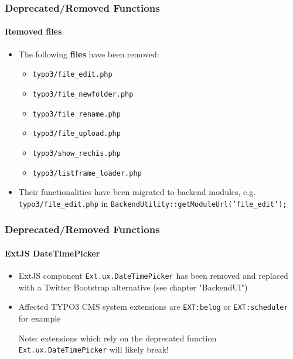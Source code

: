 \begin{frame}[fragile]
	\frametitle{Deprecated/Removed Functions}
	\framesubtitle{Removed files}

	\begin{itemize}
		\item The following \textbf{files} have been removed:

			\begin{itemize}
				\item \texttt{typo3/file\_edit.php}
				\item \texttt{typo3/file\_newfolder.php}
				\item \texttt{typo3/file\_rename.php}
				\item \texttt{typo3/file\_upload.php}
				\item \texttt{typo3/show\_rechis.php}
				\item \texttt{typo3/listframe\_loader.php}
			\end{itemize}

		\item Their functionalities have been migrated to backend modules,
			e.g. \texttt{typo3/file\_edit.php} in \texttt{BackendUtility::getModuleUrl('file\_edit');}

	\end{itemize}

\end{frame}


\begin{frame}[fragile]
	\frametitle{Deprecated/Removed Functions}
	\framesubtitle{ExtJS DateTimePicker}

	\begin{itemize}

		\item ExtJS component \texttt{Ext.ux.DateTimePicker} has been removed and replaced
			with a Twitter Bootstrap alternative (see chapter "BackendUI")

		\item Affected TYPO3 CMS system extensions are \texttt{EXT:belog} or
			\texttt{EXT:scheduler} for example

			\vspace{0.2cm}

			\begingroup
				\color{red}
					Note: extensions which rely on the deprecated function
					\texttt{Ext.ux.DateTimePicker} will likely break!
			\endgroup

	\end{itemize}

\end{frame}

